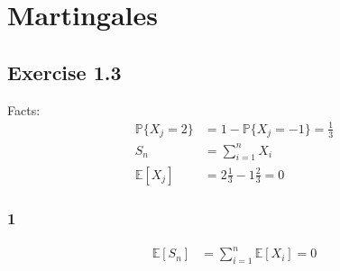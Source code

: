 \documentclass[12pt]{amsart}
\theoremstyle{plain}
\theoremstyle{definition}
\begin{document}
\section{Martingales}
\subsection*{Exercise 1.3}
Facts:
\begin{align*}
  \mathbb{P}\{X_j = 2\} &= 1 - \mathbb{P}\{X_j = -1\} = \frac{1}{3} \\
  S_n &= \sum_{i=1}^n X_i \\
  \mathbb{E}[X_j] &= 2 \frac{1}{3} - 1 \frac{2}{3} = 0
\end{align*}
\subsubsection*{1}
\begin{align*}
  \mathbb{E}[S_n] &= \sum_{i=1}^n \mathbb{E}[X_i] = 0
\end{align*}
\end{document}
